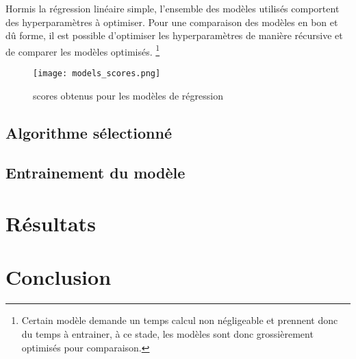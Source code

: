 Hormis la régression linéaire simple, l'ensemble des modèles utilisés comportent
des hyperparamètres à optimiser.
Pour une comparaison des modèles en bon et dû forme, il est possible d'optimiser
les hyperparamètres de manière récursive et de comparer les modèles optimisés.
\footnote{Certain modèle demande un temps calcul non négligeable et prennent donc
du temps à entrainer, à ce stade, les modèles sont donc grossièrement optimisés
pour comparaison.}

\begin{figure}[H]
  \texttt{[image: models\_scores.png]}
  \caption{scores obtenus pour les modèles de régression}
  \label{}
\end{figure}
\subsection{Algorithme sélectionné}

\subsection{Entrainement du modèle}



\section{Résultats}



\section{Conclusion}


